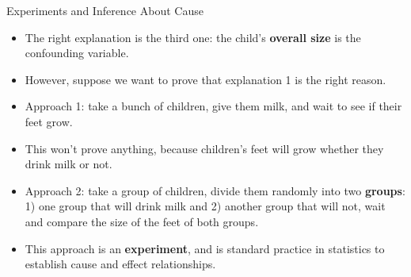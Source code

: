 \documentclass[handout]{beamer}
\begin{document}
\begin{frame}{Experiments and Inference About Cause}
\scriptsize{

\begin{itemize}

\item The right explanation is the third one: the child's \textbf{overall size} is the confounding variable.

 \item However, suppose we want to prove that explanation 1 is the right reason.
 \item Approach 1: take a bunch of children, give them milk, and wait to see if their feet grow.
 \item This won't prove anything, because children's feet will grow whether they drink milk or not.
 \item Approach 2: take a group of children, divide them randomly into two \textbf{groups}: 1) one group that will drink milk and 2) another group that will not, wait and compare the size of the feet of both groups. 
 \item This approach is an \textbf{experiment}, and is standard practice in statistics to establish cause and effect relationships.
 
 
 
\end{itemize}



} 
\end{frame}
\end{document}
